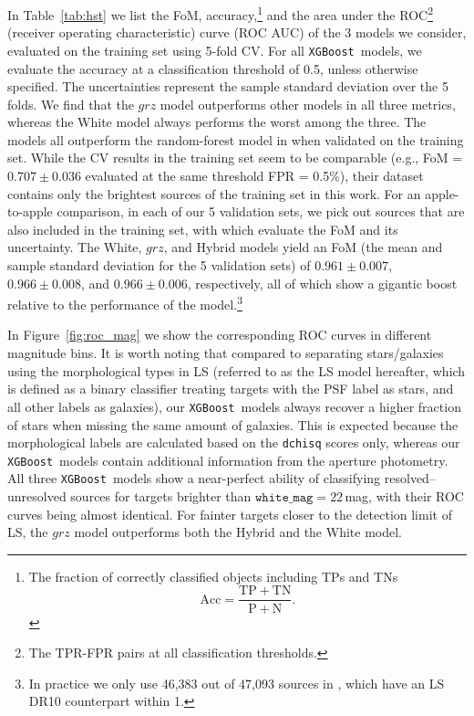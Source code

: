 \documentclass[twocolumn]{aastex631}
\newcommand{\xgboost}{\texttt{XGBoost}}
\newcommand{\dr}[1]{DR{#1}}
\begin{document}
\begin{CJK*}{UTF8}{gbsn}
In Table~\ref{tab:hst} we list the FoM, accuracy,\footnote{The fraction of correctly classified objects including TPs and TNs $$\mathrm{Acc = \frac{TP + TN}{P + N}}.$$} and the area under the ROC\footnote{The TPR-FPR pairs at all classification thresholds.} (receiver operating characteristic) curve (ROC AUC) of the 3 models we consider, evaluated on the training set using 5-fold CV. For all \xgboost\ models, we evaluate the accuracy at a classification threshold of 0.5, unless otherwise specified. The uncertainties represent the sample standard deviation over the 5 folds. We find that the $grz$ model outperforms other models in all three metrics, whereas the White model always performs the worst among the three. The models all outperform the random-forest model in  when validated on the training set. While the CV results in the  training set seem to be comparable (e.g., FoM = $0.707\pm0.036$ evaluated at the same threshold FPR = 0.5\%), their dataset contains only the brightest sources of the training set in this work. For an apple-to-apple comparison, in each of our 5 validation sets, we pick out sources that are also included in the  training set, with which evaluate the FoM and its uncertainty. The White, $grz$, and Hybrid models yield an FoM (the mean and sample standard deviation for the 5 validation sets) of $0.961\pm0.007$, $0.966\pm0.008$, and $0.966\pm0.006$, respectively, all of which show a gigantic boost relative to the performance of the  model.\footnote{In practice we only use 46,383 out of 47,093 sources in , which have an LS \dr{10} counterpart within 1\arcsec.}

In Figure~\ref{fig:roc_mag} we show the corresponding ROC curves in different magnitude bins. It is worth noting that compared to separating stars/galaxies using the morphological types in LS (referred to as the LS model hereafter, which is defined as a binary classifier treating targets with the PSF label as stars, and all other labels as galaxies), our \xgboost\ models always recover a higher fraction of stars when missing the same amount of galaxies. This is expected because the morphological labels are calculated based on the \texttt{dchisq} scores only, whereas our \xgboost\ models contain additional information from the aperture photometry.
All three \xgboost\ models show a near-perfect ability of classifying resolved--unresolved sources for targets brighter than $\texttt{white\_mag}=22$\,mag, with their ROC curves being almost identical. For fainter targets closer to the detection limit of LS, the $grz$ model outperforms both the Hybrid and the White model.


\end{CJK*}
\end{document}
